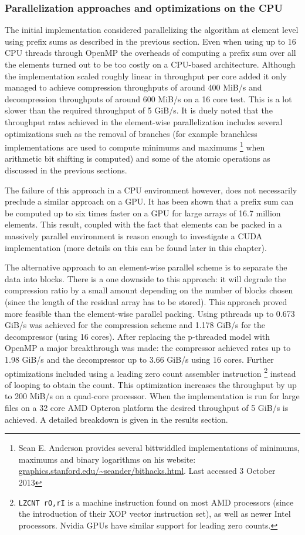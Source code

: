   \subsubsection{Parallelization approaches and optimizations on the CPU}
  The initial implementation considered parallelizing the algorithm at element level using prefix sums as described in the previous section. Even when using up to 16 CPU threads through OpenMP the overheads of computing a prefix 
  sum over all the elements turned out to be too costly on a CPU-based architecture. Although the implementation scaled roughly linear in throughput per core added it only managed to achieve compression throughputs of around 
  400 MiB/s and decompression throughputs of around 600 MiB/s on a 16 core test. This is a lot slower than the required throughput of 5 GiB/s. It is duely noted that the throughput rates achieved in the element-wise parallelization 
  includes several optimizations such as the removal of branches (for example branchless implementations are used to compute minimums and maximums \footnote{Sean E. Anderson 
  provides several bittwiddled implementations of minimums, maximums and binary logarithms on his website: \url{graphics.stanford.edu/~seander/bithacks.html}. Last accessed 3 
  October 2013} when arithmetic bit shifting is computed) and some of the atomic operations as discussed in the previous sections.
  
  The failure of this approach in a CPU environment however, does not necessarily preclude a similar approach on a GPU. It has been shown \cite{harris2007parallel} that a 
  prefix sum can be computed up to six times faster on a GPU for large arrays of 16.7 million elements. This result, coupled with the fact that elements can be packed in a massively
  parallel environment is reason enough to investigate a CUDA implementation (more details on this can be found later in this chapter).
  
  The alternative approach to an element-wise parallel scheme is to separate the data into blocks. There is a one downside to this approach: it will degrade the compression
  ratio by a small amount depending on the number of blocks chosen (since the length of the residual array has to be stored). This approach proved more feasible than the 
  element-wise parallel packing. Using pthreads up to 0.673 GiB/s was achieved for the compression scheme and 1.178 GiB/s for the decompressor (using 16 cores). After replacing
  the p-threaded model with OpenMP a major breakthrough was made: the compressor achieved rates up to 1.98 GiB/s and the decompressor up to 3.66 GiB/s using 16 cores. Further 
  optimizations included using a leading zero count assembler instruction \footnote{\texttt{LZCNT rO,rI} is a machine instruction found on most AMD processors (since the 
  introduction of their XOP vector instruction set), as well as newer Intel processors. Nvidia GPUs have similar support for leading zero counts.} instead of looping to obtain 
  the count. This optimization increases the throughput by up to 200 MiB/s on a quad-core processor. When the implementation is run for large files on a 32 core AMD Opteron platform
  the desired throughput of 5 GiB/s is achieved. A detailed breakdown is given in the results section.

